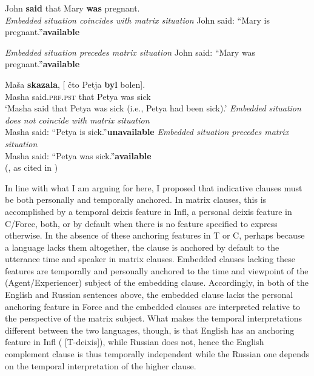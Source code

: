 \documentclass[output=paper,
modfonts,
newtxmath,
hidelinks,
]{langscibook}
\begin{document}
\ea \label{10:ex31}
	John \textbf{said} that Mary \textbf{was} pregnant.\\
	\ea \label{10:ex31a}
    \textit{Embedded situation coincides with matrix situation}
    \newline John said: “Mary is pregnant.”\hfill\textbf{available}
    
	\ex \label{10:ex31b}
    \textit{Embedded situation precedes matrix situation}
    \newline John said: “Mary was pregnant.”\hfill\textbf{available}
    
	\z
\z

\ea \label{10:ex32}
\gll Maša \textbf{skazala}, [\hspace{-2pt} čto Petja \textbf{byl} bolen].\\
    Masha said.\textsc{prf.pst} {} that Petya was sick\\
\glt `Masha said that Petya was sick (i.e., Petya had been sick).'
\ea \textit{Embedded situation does not coincide with matrix situation}\\
      Masha said: “Petya is sick.”\hfill\textbf{unavailable}
\ex      \textit{Embedded situation precedes matrix situation}\\
	Masha said: “Petya was sick.”\hfill\textbf{available}\\\hfill (\citealt[183]{Kondrashova1999}, as cited in \citealt[174]{Mezhevich2006})
\z\z

\noindent In line with what I am arguing for here, I proposed that indicative clauses must be both personally and temporally anchored. In matrix clauses, this is accomplished by a temporal deixis feature in Infl, a personal deixis feature in C/Force, both, or by default when there is no feature specified to express otherwise. In the absence of these anchoring features in T or C, perhaps because a language lacks them altogether, the clause is anchored by default to the utterance time and speaker in matrix clauses. Embedded clauses lacking these features are temporally and personally anchored to the time and viewpoint of the (Agent/Experiencer) subject of the embedding clause. Accordingly, in both of the English and Russian sentences above, the embedded clause lacks the personal anchoring feature in Force and the embedded clauses are interpreted relative to the perspective of the matrix subject. What makes the temporal interpretations different between the two languages, though, is that English has an anchoring feature in Infl ( [T-deixis]), while Russian does not, hence the English complement clause is thus temporally independent while the Russian one depends on the temporal interpretation of the higher clause.
\end{document}
